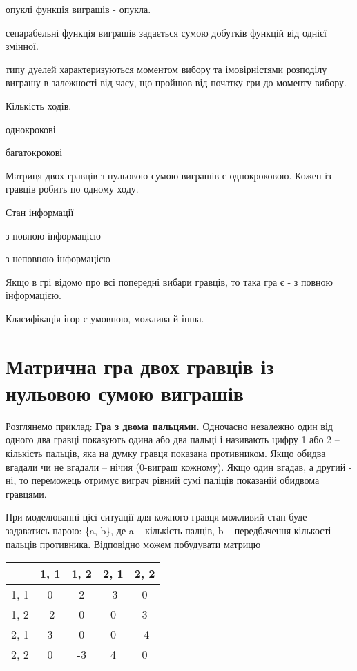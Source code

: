 \documentclass[12pt,a4paper]{book}
\newenvironment{slim_enumerate}{
\begin{enumerate}
  \setlength{\itemsep}{1pt}
  \setlength{\parskip}{0pt}
  \setlength{\parsep}{0pt}}
{\end{enumerate}}
\newenvironment{slim_itemize}{
\begin{itemize}
  \setlength{\itemsep}{1pt}
  \setlength{\parskip}{0pt}
  \setlength{\parsep}{0pt}}
{\end{itemize}}
\newenvironment{slim_description}{
\begin{description}
  \setlength{\itemsep}{2pt}
  \setlength{\parskip}{0pt}
  \setlength{\parsep}{0pt}}
{\end{description}}
\begin{document}
\begin{slim_enumerate}
\begin{slim_description}
    \item[опуклі] функція виграшів - опукла.
    \item[сепарабельні] функція виграшів задається сумою добутків функцій від однієї змінної.
    \item[типу дуелей] характеризуються моментом вибору та імовірністями розподілу виграшу в залежності від часу, що пройшов від початку гри до моменту вибору.
  \end{slim_description}
  \item Кількість ходів.
  \begin{slim_itemize}
    \item однокрокові
    \item багатокрокові
  \end{slim_itemize}
  Матриця двох гравців з нульовою сумою виграшів є однокроковою. Кожен із гравців робить по одному ходу.
  \item Стан інформації
  \begin{slim_itemize}
    \item з повною інформацією
    \item з неповною інформацією
  \end{slim_itemize}
  Якщо в грі відомо про всі попередні вибари гравців, то така гра є - з повною інформацією.
\end{slim_enumerate}

Класифікація ігор є умовною, можлива й інша.

\section{Матрична гра двох гравців із нульовою сумою виграшів}

Розглянемо приклад:
{\bf Гра з двома пальцями.} 
Одночасно незалежно один від одного два гравці показують одина або два пальці і називають цифру 1 або 2 -- кількість пальців, яка на думку гравця показана противником. Якщо обидва вгадали чи не вгадали -- нічия (0-виграш кожному). Якщо один вгадав, а другий - ні, то переможець отримує виграч рівний сумі паліців показаній обидвома гравцями.

При моделюванні цієї ситуації для кожного гравця можливий стан буде задаватись парою: \{a, b\}, де a -- кількість палців, b -- передбачення кількості пальців противника.
Відповідно можем побудувати матрицю

\begin{tabular}{ r | c | c | c | c | }
         & 1, 1 & 1, 2 & 2, 1 & 2, 2 \\ \hline
  1, 1 & 0 & 2 & -3 & 0 \\ \hline
  1, 2 & -2 & 0 & 0 & 3 \\ \hline
  2, 1 & 3 & 0 & 0 & -4 \\ \hline
  2, 2 & 0 & -3 & 4 & 0 \\ \hline
\end{tabular}
\end{document}
